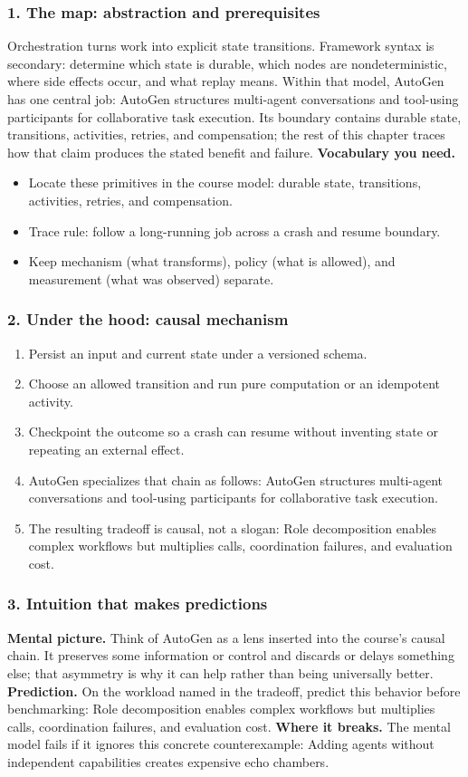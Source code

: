 \subsubsection*{1. The map: abstraction and prerequisites}
Orchestration turns work into explicit state transitions. Framework syntax is secondary: determine which state is durable, which nodes are nondeterministic, where side effects occur, and what replay means.
Within that model, AutoGen has one central job: AutoGen structures multi-agent conversations and tool-using participants for collaborative task execution. Its boundary contains durable state, transitions, activities, retries, and compensation; the rest of this chapter traces how that claim produces the stated benefit and failure.
\textbf{Vocabulary you need.}\begin{itemize}
\item Locate these primitives in the course model: durable state, transitions, activities, retries, and compensation.
\item Trace rule: follow a long-running job across a crash and resume boundary.
\item Keep mechanism (what transforms), policy (what is allowed), and measurement (what was observed) separate.
\end{itemize}
\subsubsection*{2. Under the hood: causal mechanism}\begin{enumerate}
\item Persist an input and current state under a versioned schema.
\item Choose an allowed transition and run pure computation or an idempotent activity.
\item Checkpoint the outcome so a crash can resume without inventing state or repeating an external effect.
\item AutoGen specializes that chain as follows: AutoGen structures multi-agent conversations and tool-using participants for collaborative task execution.
\item The resulting tradeoff is causal, not a slogan: Role decomposition enables complex workflows but multiplies calls, coordination failures, and evaluation cost.
\end{enumerate}
\subsubsection*{3. Intuition that makes predictions}
\textbf{Mental picture.} Think of AutoGen as a lens inserted into the course's causal chain. It preserves some information or control and discards or delays something else; that asymmetry is why it can help rather than being universally better.
\textbf{Prediction.} On the workload named in the tradeoff, predict this behavior before benchmarking: Role decomposition enables complex workflows but multiplies calls, coordination failures, and evaluation cost.
\textbf{Where it breaks.} The mental model fails if it ignores this concrete counterexample: Adding agents without independent capabilities creates expensive echo chambers.
